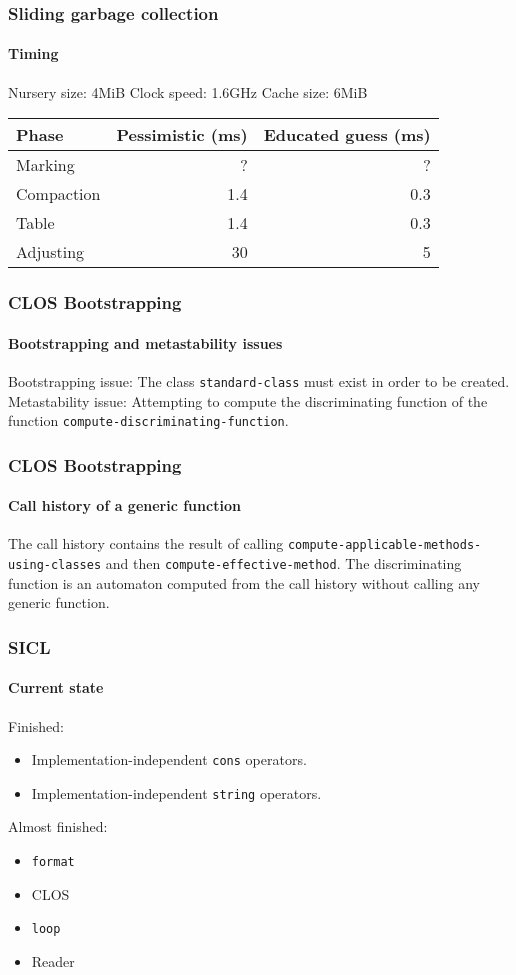 \documentclass{beamer}
\begin{document}
\begin{frame}
  \frametitle{Sliding garbage collection}
  \framesubtitle{Timing}

Nursery size: 4MiB
\vskip 0.25cm
Clock speed: 1.6GHz
\vskip 0.25cm
Cache size: 6MiB
\vskip 0.5cm
\begin{tabular}{|l|r|r|}
  \hline
  Phase & Pessimistic (ms) & Educated guess (ms)\\
  \hline
  \hline
  Marking & ? & ?\\
  \hline
  Compaction & 1.4 &  0.3\\
  \hline
  Table   & 1.4 & 0.3 \\
  \hline
  Adjusting & 30 & 5 \\
  \hline
\end{tabular}

\end{frame}
\begin{frame}
  \frametitle{CLOS Bootstrapping}
  \framesubtitle{Bootstrapping and metastability issues}

Bootstrapping issue: The class \texttt{standard-class} must exist in
order to be created.
\vskip 0.25cm
Metastability issue: Attempting to compute the discriminating function
of the function \texttt{compute-discriminating-function}.

\end{frame}
\begin{frame}
  \frametitle{CLOS Bootstrapping}
  \framesubtitle{Call history of a generic function}

The call history contains the result of calling
\texttt{compute-applicable-methods-using-classes} and then
\texttt{compute-effective-method}.
\vskip 0.25cm
The discriminating function is an automaton computed from the call
history without calling any generic function.

\end{frame}
\begin{frame}
  \frametitle{SICL}
  \framesubtitle{Current state}
Finished:
\vskip 0.25cm
\begin{itemize}
\item Implementation-independent \texttt{cons} operators. 
\item Implementation-independent \texttt{string} operators.
\end{itemize}
\vskip 0.5cm
Almost finished:
\vskip 0.25cm
\begin{itemize}
\item \texttt{format}
\item CLOS
\item \texttt{loop}
\item Reader
\end{itemize}

\end{frame}
\end{document}
